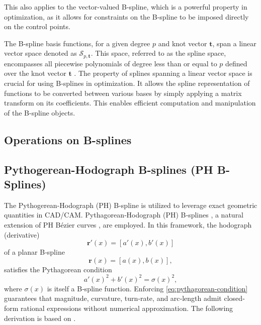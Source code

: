 This also applies to the vector-valued B-spline, which is a powerful property in optimization, as it allows for constraints on the B-spline to be imposed directly on the control points.

The B-spline basis functions, for a given degree \(p\) and knot vector \(\mathbf{t}\), span a linear vector space denoted as \(\mathcal{S}_{p, \mathbf{t}}\). This space, referred to as the spline space, encompasses all piecewise polynomials of degree less than or equal to \(p\) defined over the knot vector \(\mathbf{t}\) \citep{Grimstad2016}. The property of splines spanning a linear vector space is crucial for using B-splines in optimization. 
It allows the spline representation of functions to be converted between various bases by simply applying a matrix transform on its coefficients. This enables efficient computation and manipulation of the B-spline objects.

\subsection{Operations on B-splines}



\subsection{Pythogerean-Hodograph B-splines (PH B-Splines)}\label{sec:pythogerean-hodograph}
The Pythogerean-Hodograph (PH) B-spline is utilized to leverage exact geometric quantities in CAD/CAM. Pythagorean‐Hodograph (PH) B‐splines \cite{Albrecht2016}, a natural extension of PH Bézier curves \cite{Farouki1990}, are employed. In this framework, the hodograph (derivative) 
\begin{equation*}
    \mathbf r'(x) = [a'(x), b'(x)]
\end{equation*}
of a planar B‐spline
\begin{equation*}
    \mathbf r(x) = [a(x), b(x)],
\end{equation*}
satisfies the Pythagorean condition
\begin{equation}\label{eq:pythagorean-condition}
a'(x)^2 + b'(x)^2 = \sigma(x)^2,
\end{equation}
where $\sigma(x)$ is itself a B‐spline function. Enforcing \cref{eq:pythagorean-condition} guarantees that magnitude, curvature, turn‐rate, and arc‐length admit closed‐form rational expressions without numerical approximation. The following derivation is based on \cite{Albrecht2016}.

